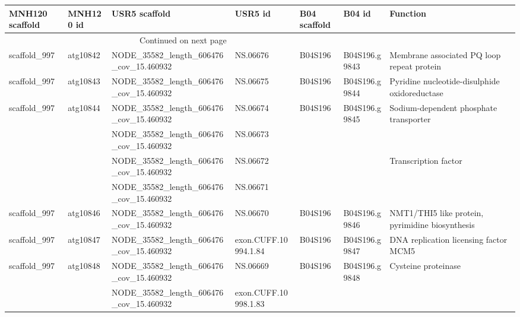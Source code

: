 \begin{longtable}{lllllll}
\toprule
MNH120 scaffold &     MNH120 id &                           USR5 scaffold &               USR5 id & B04 scaffold &         B04 id &                                  Function \\
\midrule
\endhead
\midrule
\multicolumn{3}{r}{{Continued on next page}} \\
\midrule
\endfoot

\bottomrule
\endlastfoot
   scaffold\_997 &      atg10842 &  NODE\_35582\_length\_606476\_cov\_15.460932 &              NS.06676 &      B04S196 &  B04S196.g9843 &       Membrane associated PQ loop repeat protein \\
   scaffold\_997 &      atg10843 &  NODE\_35582\_length\_606476\_cov\_15.460932 &              NS.06675 &      B04S196 &  B04S196.g9844 &    Pyridine nucleotide-disulphide oxidoreductase \\
   scaffold\_997 &      atg10844 &  NODE\_35582\_length\_606476\_cov\_15.460932 &              NS.06674 &      B04S196 &  B04S196.g9845 &           Sodium-dependent phosphate transporter \\
                &               &  NODE\_35582\_length\_606476\_cov\_15.460932 &              NS.06673 &              &                &                                                  \\
                &               &  NODE\_35582\_length\_606476\_cov\_15.460932 &              NS.06672 &              &                &                             Transcription factor \\
                &               &  NODE\_35582\_length\_606476\_cov\_15.460932 &              NS.06671 &              &                &                                                  \\
   scaffold\_997 &      atg10846 &  NODE\_35582\_length\_606476\_cov\_15.460932 &              NS.06670 &      B04S196 &  B04S196.g9846 &  NMT1/THI5 like protein, pyrimidine biosynthesis \\
   scaffold\_997 &      atg10847 &  NODE\_35582\_length\_606476\_cov\_15.460932 &  exon.CUFF.10994.1.84 &      B04S196 &  B04S196.g9847 &            DNA replication licensing factor MCM5 \\
   scaffold\_997 &      atg10848 &  NODE\_35582\_length\_606476\_cov\_15.460932 &              NS.06669 &      B04S196 &  B04S196.g9848 &                              Cysteine proteinase \\
                &               &  NODE\_35582\_length\_606476\_cov\_15.460932 &  exon.CUFF.10998.1.83 &              &                &                                                  \\

\end{longtable}
